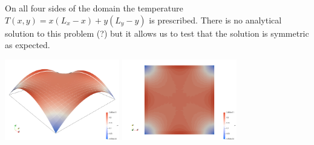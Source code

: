 On all four sides of the domain the temperature $T(x,y)=x(L_x-x)+y(L_y-y)$
is prescribed. There is no analytical solution to this problem (?) but 
it allows us to test that the solution is symmetric as expected.

\begin{center}
\includegraphics[width=5cm]{python_codes/fieldstone_79/results/exp2/temp}
\includegraphics[width=5cm]{python_codes/fieldstone_79/results/exp2/temp2}
\end{center}




